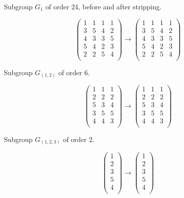 \documentclass[12pt]{extarticle}
\begin{document}
Subgroup $G_1$ of order 24, before and after stripping.

$$\begin{pmatrix} 
  1 &  1 &  1 &  1 \\ 
  3 &  5 &  4 &  2 \\ 
  4 &  3 &  3 &  5 \\ 
  5 &  4 &  2 &  3 \\ 
  2 &  2 &  5 &  4 \\ 
\end{pmatrix}
\longrightarrow
\begin{pmatrix} 
  1 &  1 &  1 &  1 \\ 
  3 &  5 &  4 &  2 \\ 
  4 &  3 &  3 &  5 \\ 
  5 &  4 &  2 &  3 \\ 
  2 &  2 &  5 &  4 \\ 
\end{pmatrix} $$
     
Subgroup $G_{(1,2)}$ of order 6.

$$\begin{pmatrix} 
  1 &  1 &  1 \\ 
  2 &  2 &  2 \\ 
  5 &  3 &  4 \\ 
  3 &  5 &  5 \\ 
  4 &  4 &  3 \\ 
\end{pmatrix} 
\longrightarrow
\begin{pmatrix} 
  1 &  1 &  1 \\ 
  2 &  2 &  2 \\ 
  5 &  3 &  4 \\ 
  3 &  5 &  5 \\ 
  4 &  4 &  3 \\ 
\end{pmatrix} $$

Subgroup $G_{(1,2,3)}$ of order 2.

$$\begin{pmatrix} 
  1 \\ 
  2 \\ 
  3 \\ 
  5 \\ 
  4 \\ 
\end{pmatrix} 
\longrightarrow
\begin{pmatrix} 
  1 \\ 
  2 \\ 
  3 \\ 
  5 \\ 
  4 \\ 
\end{pmatrix} $$
\end{document}
